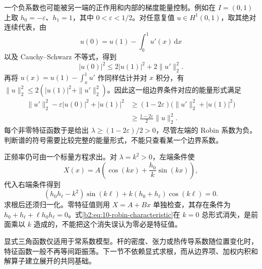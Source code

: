 \ProseParagraphBreak

一个负系数也可能被另一端的正作用和内部的梯度能量控制。例如在 \(I=(0,1)\) 上取 \(h_0=-\varepsilon\)、\(h_1=1\)，其中 \(0<\varepsilon<1/2\)。对任意复值 \(u\in H^1(0,1)\)，取其绝对连续代表，由
\[
 u(0)=u(1)-\int_0^1u'(x)\,\mathrm{d}x
\]
以及 Cauchy--Schwarz 不等式，得到
\[
 |u(0)|^2\leq2|u(1)|^2+2\|u'\|_2^2.
\]
再将 \(u(x)=u(1)-\int_x^1u'\) 作同样估计并对 \(x\) 积分，有 \(\|u\|_2^2\leq2(|u(1)|^2+\|u'\|_2^2)\)。因此这一组边界条件对应的能量形式满足
\[
 \begin{aligned}
 \|u'\|_2^2-\varepsilon|u(0)|^2+|u(1)|^2
 &\geq(1-2\varepsilon)\bigl(\|u'\|_2^2+|u(1)|^2\bigr)\\
 &\geq\frac{1-2\varepsilon}{2}\|u\|_2^2.
 \end{aligned}
\]
每个非零特征函数于是给出 \(\lambda\geq(1-2\varepsilon)/2>0\)，尽管左端的 Robin 系数为负。判断谱的符号需要比较完整的能量形式，不能只查看某一个边界系数。

\ProseParagraphBreak

正频率仍可由一个标量方程求出。对 \(\lambda=k^2>0\)，左端条件使
\[
 X(x)=A\left(\cos(kx)+\dfrac{h_0}{k}\sin(kx)\right),
\]
代入右端条件得到
\begin{equation}\label{b2:eq:10-robin-characteristic}
 (h_0h_\ell-k^2)\sin(k\ell)
 +k(h_0+h_\ell)\cos(k\ell)=0.
\end{equation}
求根后还须归一化。零特征值则用 \(X=A+Bx\) 单独检查，其存在条件为 \(h_0+h_\ell+\ell h_0h_\ell=0\)。式\eqref{b2:eq:10-robin-characteristic}在 \(k=0\) 总形式消失，是前面乘以 \(k\) 造成的，不能把这个消失误认为零必是特征值。

\ProseParagraphBreak

显式三角函数仅适用于常系数模型。杆的密度、张力或热传导系数随位置变化时，特征函数一般不再等间距振荡。下一节不依赖显式求根，而从边界项、加权内积和解算子建立展开的共同基础。
